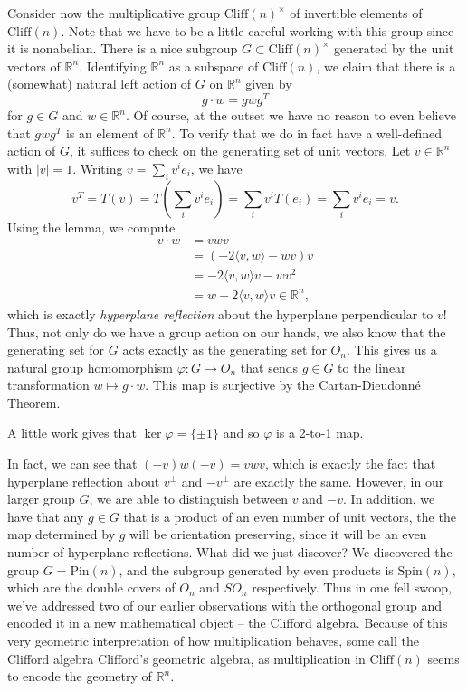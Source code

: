 \documentclass{article}
\newcommand{\R}{\mathbb{R}}
\begin{document}
Consider now the multiplicative group $\mathrm{Cliff}(n)^\times$ of invertible elements of $\mathrm{Cliff}(n)$. Note that we have to be a little careful working with this group since it is nonabelian. There is a nice subgroup $G \subset \mathrm{Cliff}(n)^\times$ generated by the unit vectors of $\R^n$. Identifying $\R^n$ as a subspace of $\mathrm{Cliff}(n)$, we claim that there is a (somewhat) natural left action of $G$ on $\R^n$ given by 
$$g\cdot w = gwg^T $$
for $g \in G$ and $w \in \R^n$. Of course, at the outset we have no reason to even believe that $gwg^T$ is an element of $\R^n$. To verify that we do in fact have a well-defined action of $G$, it suffices to check on the generating set of unit vectors. Let $v \in \R^n$ with $|v| = 1$. Writing $v = \sum_i v^ie_i$, we have
$$v^T = T(v) = T \left( \sum_i v^ie_i \right) = \sum_i v^iT(e_i) = \sum_i v^ie_i = v.$$
Using the lemma, we compute
\begin{align*}
v\cdot w &= vwv \\ 
&= (-2 \langle v,w \rangle - wv)v \\
&= -2\langle v,w \rangle v -wv^2 \\
&= w - 2\langle v,w \rangle v \in \R^n,
\end{align*}
which is exactly \emph{hyperplane reflection} about the hyperplane perpendicular to $v$! Thus, not only do we have a group action on our hands, we also know that the generating set for $G$ acts exactly as the generating set for $O_n$. This gives us a natural group homomorphism $\varphi : G \to O_n$ that sends $g \in G$ to the linear transformation $w \mapsto g\cdot w$. This map is surjective by the Cartan-Dieudonn\'{e} Theorem. 

A little work gives that $\ker \varphi = \{\pm 1\}$ and so $\varphi$ is a 2-to-1 map. 


In fact, we can see that $(-v)w(-v) = vwv$, which is exactly the fact that hyperplane reflection about $v^\perp$ and $-v^\perp$ are exactly the same. However, in our larger group $G$, we are able to distinguish between $v$ and $-v$. In addition, we have that any $g \in G$ that is a product of an even number of unit vectors, the the map determined by $g$ will be orientation preserving, since it will be an even number of hyperplane reflections. What did we just discover? We discovered the group $G = \mathrm{Pin}(n)$, and the subgroup generated by even products is $\mathrm{Spin}(n)$, which are the double covers of $O_n$ and $SO_n$ respectively. Thus in one fell swoop, we've addressed two of our earlier observations with the orthogonal group and encoded it in a new mathematical object -- the Clifford algebra. Because of this very geometric interpretation of how multiplication behaves, some call the Clifford algebra Clifford's geometric algebra, as multiplication in $\mathrm{Cliff}(n)$ seems to encode the geometry of $\R^n$.
\end{document}
